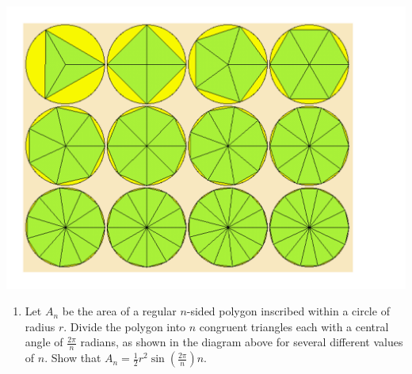 \documentclass[12pt]{article}
\begin{document}
\begin{enumerate}
\begin{center}

\includegraphics[scale=0.35]{Inscribed.pdf}

\end{center}

\begin{enumerate}

\item Let $A_n$ be the area of a regular $n$-sided polygon inscribed within a circle of radius $r$.  Divide the polygon into $n$ congruent triangles each with a central angle of $\frac{2\pi}{n}$ radians, as shown in the diagram above for several different values of $n$.    Show that $A_n=\frac{1}{2}r^2 \sin{\left(\frac{2\pi}{n}\right)} n$.


\end{enumerate}
\end{enumerate}
\end{document}
